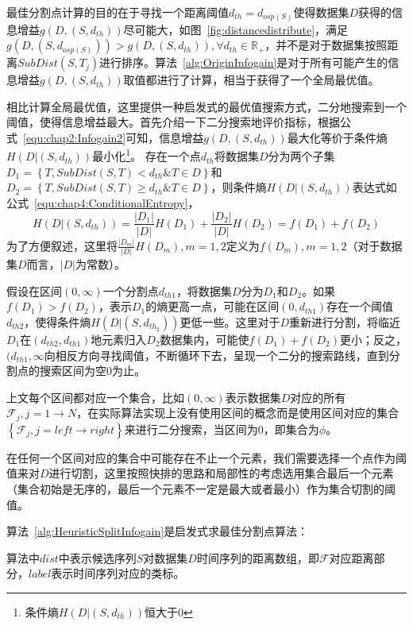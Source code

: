 最佳分割点计算的目的在于寻找一个距离阈值$d_{th}=d_{osp(S)}$使得数据集$D$获得的信息增益$g(D,(S,d_{th}))$尽可能大，如图~\ref{fig:distancedistribute}，满足$g(D,(S,d_{osp(S)}))>g(D,(S,d_{th})),\forall d_{th}\in \mathbb{R}_+$，并不是对于数据集按照距离$SubDist(S,T_j)$进行排序。算法~\ref{alg:OriginInfogain}是对于所有可能产生的信息增益$g(D,(S,d_{th}))$取值都进行了计算，相当于获得了一个全局最优值。

相比计算全局最优值，这里提供一种启发式的最优值搜索方式，二分地搜索到一个阈值，使得信息增益最大。首先介绍一下二分搜索地评价指标，根据公式~\ref{equ:chap2:Infogain2}可知，信息增益$g(D,(S,d_{th}))$最大化等价于条件熵$H(D|(S,d_{th}))$最小化\footnote{条件熵$H(D|(S,d_{th}))$恒大于$0$}。
存在一个点$d_{th}$将数据集$D$分为两个子集$D_1 = \left\lbrace T,SubDist(S,T)<d_{th} \& T\in D\right\rbrace $和$D_2 = \left\lbrace T,SubDist(S,T) \geq d_{th}\& T\in D\right\rbrace$，则条件熵$H(D|(S,d_{th}))$表达式如公式~\ref{equ:chap4:ConditionalEntropy}，
\begin{equation}
\label{equ:chap4:ConditionalEntropy}
H(D|(S,d_{th})) = \frac{|D_1|}{|D|}H(D_1)+\frac{|D_2|}{|D|}H(D_2) = f(D_1) + f(D_2)
\end{equation}
为了方便叙述，这里将$\frac{|D_m|}{|D|}H(D_m),m=1,2$定义为$f(D_m),m=1,2$（对于数据集$D$而言，$|D|$为常数）。

假设在区间$(0,\infty)$一个分割点$d_{th1}$，将数据集$D$分为$D_1$和$D_2$。如果$f(D_1)>f(D_2)$，表示$D_1$的熵更高一点，可能在区间$(0,d_{th1})$存在一个阈值$d_{th2}$，使得条件熵$H(D|(S,d_{th_2}))$更低一些。这里对于$D$重新进行分割，将临近$D_1$在$(d_{th2},d_{th1})$地元素归入$D_2$数据集内，可能使$f(D_1)+f(D_2)$更小；反之，$(d_{th1},\infty$向相反方向寻找阈值，不断循环下去，呈现一个二分的搜索路线，直到分割点的搜索区间为空$0$为止。

上文每个区间都对应一个集合，比如$(0,\infty)$表示数据集$D$对应的所有$\mathcal{F}_j,j=1\to N$，在实际算法实现上没有使用区间的概念而是使用区间对应的集合$\left\lbrace \mathcal{F}_j,j=left\to right\right\rbrace $来进行二分搜索，当区间为0，即集合为$\phi$。

在任何一个区间对应的集合中可能存在不止一个元素，我们需要选择一个点作为阈值来对$D$进行切割，这里按照快排的思路和局部性的考虑选用集合最后一个元素（集合初始是无序的，最后一个元素不一定是最大或者最小）作为集合切割的阈值。 

算法~\ref{alg:HeuristicSplitInfogain}是启发式求最佳分割点算法：

算法中$dist$中表示候选序列$S$对数据集$D$时间序列的距离数组，即$\mathcal{F}$对应距离部分，$label$表示时间序列对应的类标。

